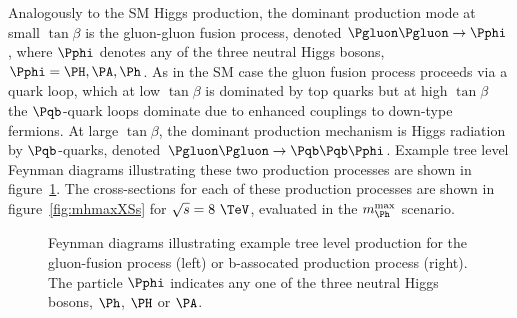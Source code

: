 Analogously to the \ac{SM} Higgs production, the dominant production mode at
small $\tan\beta$ is the gluon-gluon fusion process, denoted
$\Pgluon\Pgluon\to\Pphi$, where $\Pphi$ denotes any of the three neutral Higgs
bosons, $\Pphi=\PH,\PA,\Ph$. As in the \ac{SM} case the gluon fusion process
proceeds via a quark loop, which at low $\tan\beta$ is dominated by top quarks
but at high $\tan\beta$ the $\Pqb$-quark loops dominate due to enhanced couplings to
down-type fermions. At large $\tan\beta$, the dominant production mechanism is
Higgs radiation by $\Pqb$-quarks, denoted $\Pgluon\Pgluon\to\Pqb\Pqb\Pphi$.
Example tree level Feynman diagrams illustrating these two production processes
are shown in figure~\ref{fig:mssmfeynman}. The cross-sections for each of these 
production processes are shown in
figure~\ref{fig:mhmaxXSs} for $\sqrt{s}=8~\TeV$, evaluated in the $m_{\Ph}^{\text{max}}$
scenario.

\begin{figure}[htbp]
\caption[Feynman diagrams illustrating example tree level production of neutral
Higgs bosons in the MSSM.]{Feynman diagrams illustrating example tree level production for the
gluon-fusion process (left) or b-assocated production process (right). The
particle $\Pphi$ indicates any one of the three neutral Higgs bosons, $\Ph$,
$\PH$ or $\PA$.}
\label{fig:mssmfeynman}
\end{figure}

